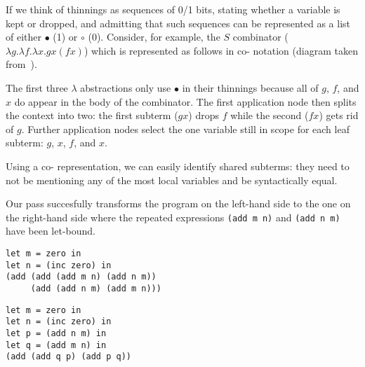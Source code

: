 If we think of thinnings as sequences of 0/1 bits, stating whether a variable is kept or dropped, and admitting that such sequences can be represented as a list of either $\bullet$ (1) or $\circ$ (0).
Consider, for example, the $S$ combinator ($\lambda g. \lambda f. \lambda x. g x (f x)$) which is represented as follows in co-\DeBruijn{} notation (diagram taken from~\cite{MANUAL:draft/Allais22}).

\begin{center}
  \codebruijnexamplegraph{}
\end{center}

The first three $\lambda$ abstractions only use $\bullet$ in their thinnings because all of $g$, $f$, and $x$ do appear in the body of the combinator.
%
The first application node then splits the context into two: the first subterm ($g x$) drops $f$ while the second ($f x$) gets rid of $g$.
%
Further application nodes select the one variable still in scope for each leaf subterm: $g$, $x$, $f$, and $x$.

Using a co-\DeBruijn{} representation, we can easily identify shared subterms:
%
they need to not be mentioning any of the most local variables and be syntactically equal.


Our pass succesfully transforms the program on the left-hand side to the one on the right-hand side where the repeated expressions \texttt{(add m n)} and \texttt{(add n m)} have been let-bound.

\begin{minipage}[t]{0.4\textwidth}
\begin{Verbatim}
let m = zero in
let n = (inc zero) in
(add (add (add m n) (add n m))
     (add (add n m) (add m n)))
\end{Verbatim}
\end{minipage}\hfill\begin{minipage}[t]{0.4\textwidth}
\begin{Verbatim}
let m = zero in
let n = (inc zero) in
let p = (add n m) in
let q = (add m n) in
(add (add q p) (add p q))
\end{Verbatim}
\end{minipage}
